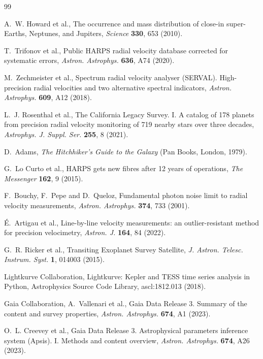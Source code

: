 \documentclass[3p,11pt]{elsarticle}
\begin{document}
\begin{thebibliography}{99}\small\raggedright
\setlength{\itemsep}{1pt}

A.~W. Howard et al., The occurrence and mass distribution of close-in super-Earths, Neptunes, and
Jupiters, \emph{Science} \textbf{330}, 653 (2010).

T.~Trifonov et al., Public HARPS radial velocity database corrected for systematic errors,
\emph{Astron. Astrophys.} \textbf{636}, A74 (2020).

M.~Zechmeister et al., Spectrum radial velocity analyser (SERVAL). High-precision radial velocities and
two alternative spectral indicators, \emph{Astron. Astrophys.} \textbf{609}, A12 (2018).

L.~J. Rosenthal et al., The California Legacy Survey. I. A catalog of 178 planets from precision radial
velocity monitoring of 719 nearby stars over three decades, \emph{Astrophys. J. Suppl. Ser.}
\textbf{255}, 8 (2021).

D.~Adams, \emph{The Hitchhiker's Guide to the Galaxy} (Pan Books, London, 1979).

G.~Lo Curto et al., HARPS gets new fibres after 12 years of operations, \emph{The Messenger}
\textbf{162}, 9 (2015).

F.~Bouchy, F.~Pepe and D.~Queloz, Fundamental photon noise limit to radial velocity measurements,
\emph{Astron. Astrophys.} \textbf{374}, 733 (2001).

\'E.~Artigau et al., Line-by-line velocity measurements: an outlier-resistant method for precision
velocimetry, \emph{Astron. J.} \textbf{164}, 84 (2022).

G.~R. Ricker et al., Transiting Exoplanet Survey Satellite, \emph{J. Astron. Telesc. Instrum. Syst.}
\textbf{1}, 014003 (2015).

Lightkurve Collaboration, Lightkurve: Kepler and TESS time series analysis in Python, Astrophysics
Source Code Library, ascl:1812.013 (2018).

Gaia Collaboration, A.~Vallenari et al., Gaia Data Release 3. Summary of the content and survey
properties, \emph{Astron. Astrophys.} \textbf{674}, A1 (2023).

O.~L. Creevey et al., Gaia Data Release 3. Astrophysical parameters inference system (Apsis). I. Methods
and content overview, \emph{Astron. Astrophys.} \textbf{674}, A26 (2023).


\end{thebibliography}
\end{document}
